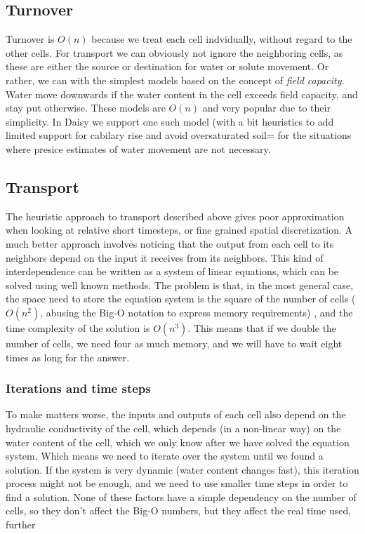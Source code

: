 \documentclass[a4paper,11pt,twoside]{article}
\begin{document}
\subsection{Turnover}

Turnover is $O(n)$ because we treat each cell indvidually, without
regard to the other cells.  For transport we can obviously not ignore
the neighboring cells, as these are either the source or destination
for water or solute movement.  Or rather, we can with the simplest
models based on the concept of \emph{field capacity}.  Water move
downwards if the water content in the cell exceeds field capacity, and
stay put otherwise.  These models are $O(n)$ and very popular due to
their simplicity.  In Daisy we support one such model (with a bit
heuristics to add limited support for cabilary rise and avoid
oversaturated soil= for the situations where presice estimates of
water movement are not necessary.

\subsection{Transport}

The heuristic approach to transport described above gives poor
approximation when looking at relative short timesteps, or fine
grained spatial discretization.  A much better approach involves
noticing that the output from each cell to its neighbors depend on the
input it receives from its neighbors.  This kind of interdependence
can be written as a system of linear equations, which can be solved
using well known methods.  The problem is that, in the most general
case, the space need to store the equation system is the square of the
number of cells ($O(n^2)$, abusing the Big-O notation to express
memory requirements) , and the time complexity of the solution is
$O(n^3)$.  This means that if we double the number of cells, we need
four as much memory, and we will have to wait eight times as long for
the answer.  

\subsubsection{Iterations and time steps}

To make matters worse, the inputs and outputs of each cell also depend
on the hydraulic conductivity of the cell, which depends (in a
non-linear way) on the water content of the cell, which we only know
after we have solved the equation system.  Which means we need to
iterate over the system until we found a solution.  If the system is
very dynamic (water content changes fast), this iteration process
might not be enough, and we need to use smaller time steps in order to
find a solution.  None of these factors have a simple dependency on
the number of cells, so they don't affect the Big-O numbers, but they
affect the real time used, further 
\end{document}
